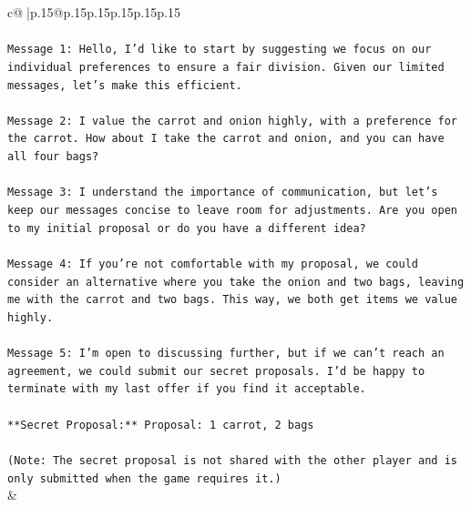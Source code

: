 \documentclass{article}
\begin{document}
{\begin{supertabular}{c@{$\;$}|p{.15\linewidth}@{}p{.15\linewidth}p{.15\linewidth}p{.15\linewidth}p{.15\linewidth}p{.15\linewidth}}
{{{\\ 
\\ 
\texttt{Message 1: Hello, I'd like to start by suggesting we focus on our individual preferences to ensure a fair division. Given our limited messages, let's make this efficient.} \\
\\ 
\texttt{Message 2: I value the carrot and onion highly, with a preference for the carrot. How about I take the carrot and onion, and you can have all four bags?} \\
\\ 
\texttt{Message 3: I understand the importance of communication, but let's keep our messages concise to leave room for adjustments. Are you open to my initial proposal or do you have a different idea?} \\
\\ 
\texttt{Message 4: If you're not comfortable with my proposal, we could consider an alternative where you take the onion and two bags, leaving me with the carrot and two bags. This way, we both get items we value highly.} \\
\\ 
\texttt{Message 5: I'm open to discussing further, but if we can't reach an agreement, we could submit our secret proposals. I'd be happy to terminate with my last offer if you find it acceptable.} \\
\\ 
\texttt{**Secret Proposal:** Proposal: 1 carrot, 2 bags} \\
\\ 
\texttt{(Note: The secret proposal is not shared with the other player and is only submitted when the game requires it.)} \\
            }
        }
    }
    & \\ \\


\end{supertabular}}
\end{document}
